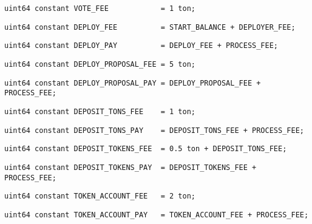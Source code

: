 \begin{lstlisting}[firstnumber=13]
    uint64 constant VOTE_FEE            = 1 ton;
\end{lstlisting}

\begin{lstlisting}[firstnumber=14]
    uint64 constant DEPLOY_FEE          = START_BALANCE + DEPLOYER_FEE;
\end{lstlisting}

\begin{lstlisting}[firstnumber=15]
    uint64 constant DEPLOY_PAY          = DEPLOY_FEE + PROCESS_FEE;
\end{lstlisting}

\begin{lstlisting}[firstnumber=16]
    uint64 constant DEPLOY_PROPOSAL_FEE = 5 ton;
\end{lstlisting}

\begin{lstlisting}[firstnumber=17]
    uint64 constant DEPLOY_PROPOSAL_PAY = DEPLOY_PROPOSAL_FEE + PROCESS_FEE;
\end{lstlisting}

\begin{lstlisting}[firstnumber=18]
    uint64 constant DEPOSIT_TONS_FEE    = 1 ton;
\end{lstlisting}

\begin{lstlisting}[firstnumber=19]
    uint64 constant DEPOSIT_TONS_PAY    = DEPOSIT_TONS_FEE + PROCESS_FEE;
\end{lstlisting}

\begin{lstlisting}[firstnumber=20]
    uint64 constant DEPOSIT_TOKENS_FEE  = 0.5 ton + DEPOSIT_TONS_FEE;
\end{lstlisting}

\begin{lstlisting}[firstnumber=21]
    uint64 constant DEPOSIT_TOKENS_PAY  = DEPOSIT_TOKENS_FEE + PROCESS_FEE;
\end{lstlisting}

\begin{lstlisting}[firstnumber=22]
    uint64 constant TOKEN_ACCOUNT_FEE   = 2 ton;
\end{lstlisting}

\begin{lstlisting}[firstnumber=23]
    uint64 constant TOKEN_ACCOUNT_PAY   = TOKEN_ACCOUNT_FEE + PROCESS_FEE;
\end{lstlisting}

